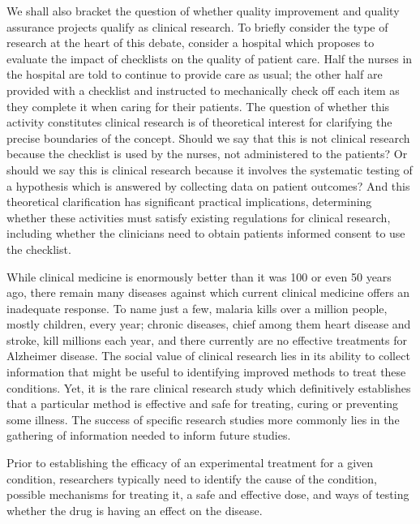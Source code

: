 \documentclass[12p]{article}
\begin{document}
We shall also bracket the question of whether quality improvement and quality assurance projects qualify as clinical research. To briefly consider the type of research at the heart of this debate, consider a hospital which proposes to evaluate the impact of checklists on the quality of patient care. Half the nurses in the hospital are told to continue to provide care as usual; the other half are provided with a checklist and instructed to mechanically check off each item as they complete it when caring for their patients. The question of whether this activity constitutes clinical research is of theoretical interest for clarifying the precise boundaries of the concept. Should we say that this is not clinical research because the checklist is used by the nurses, not administered to the patients? Or should we say this is clinical research because it involves the systematic testing of a hypothesis which is answered by collecting data on patient outcomes? And this theoretical clarification has significant practical implications, determining whether these activities must satisfy existing regulations for clinical research, including whether the clinicians need to obtain patients informed consent to use the checklist.

While clinical medicine is enormously better than it was 100 or even 50 years ago, there remain many diseases against which current clinical medicine offers an inadequate response. To name just a few, malaria kills over a million people, mostly children, every year; chronic diseases, chief among them heart disease and stroke, kill millions each year, and there currently are no effective treatments for Alzheimer disease. The social value of clinical research lies in its ability to collect information that might be useful to identifying improved methods to treat these conditions. Yet, it is the rare clinical research study which definitively establishes that a particular method is effective and safe for treating, curing or preventing some illness. The success of specific research studies more commonly lies in the gathering of information needed to inform future studies.

Prior to establishing the efficacy of an experimental treatment for a given condition, researchers typically need to identify the cause of the condition, possible mechanisms for treating it, a safe and effective dose, and ways of testing whether the drug is having an effect on the disease.
\end{document}
